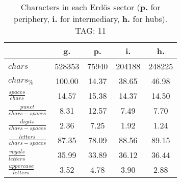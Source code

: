 \begin{table}[h!]
\begin{center}
\begin{tabular}{| l | c | c | c | c |}\hline
 & g. & p. & i. & h. \\\hline
$chars$ & 528353  & 75940  & 204188  & 248225 \\\hline
$chars_{\%}$ & 100.00  & 14.37  & 38.65  & 46.98 \\\hline
$\frac{spaces}{chars}$ & 14.57  & 15.38  & 14.37  & 14.50 \\\hline
$\frac{punct}{chars-spaces}$ & 8.31  & 12.57  & 7.49  & 7.70 \\\hline
$\frac{digits}{chars-spaces}$ & 2.36  & 7.25  & 1.92  & 1.24 \\\hline
$\frac{letters}{chars-spaces}$ & 87.35  & 78.09  & 88.56  & 89.15 \\\hline
$\frac{vogals}{letters}$ & 35.99  & 33.89  & 36.12  & 36.44 \\\hline
$\frac{uppercase}{letters}$ & 3.52  & 4.78  & 3.90  & 2.88 \\\hline
\end{tabular}
\caption{Characters in each Erd\"os sector ({{\bf p.}} for periphery, {{\bf i.}} for intermediary, 
    {{\bf h.}} for hubs). TAG: 11}
\end{center}
\end{table}